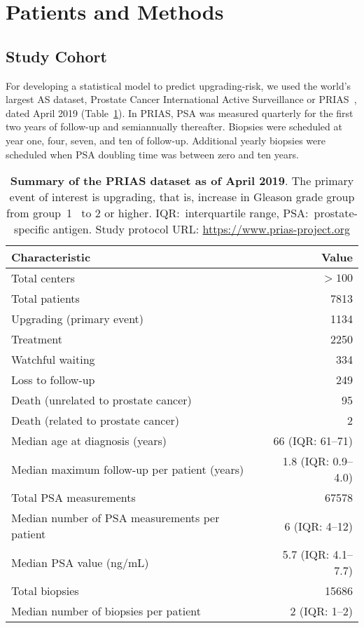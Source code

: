 \section{Patients and Methods}
\subsection{Study Cohort}
\label{subsec:cohort}
For developing a statistical model to predict upgrading-risk, we used the world's largest AS dataset, Prostate Cancer International Active Surveillance or PRIAS~\citep{bul2013active}, dated April 2019 (Table~\ref{table:prias_summary}). In PRIAS, PSA was measured quarterly for the first two years of follow-up and semiannually thereafter. Biopsies were scheduled at year one, four, seven, and ten of follow-up. Additional yearly biopsies were scheduled when PSA doubling time was between zero and ten years.

\begin{table}
\small\sf\centering
\caption{\textbf{Summary of the PRIAS dataset as of April 2019}. The primary event of interest is upgrading, that is, increase in Gleason grade group from group~1~\citep{epsteinGG2014} to 2 or higher. IQR:~interquartile range, PSA:~prostate-specific antigen. Study protocol URL: \url{https://www.prias-project.org}}
\label{table:prias_summary}
\begin{tabular}{lr}
\toprule
\textbf{Characteristic} & \textbf{Value}\\
\midrule
Total centers & $> 100$\\
Total patients & 7813\\
Upgrading (primary event) & 1134\\
Treatment & 2250\\
Watchful waiting & 334\\
Loss to follow-up & 249\\
Death (unrelated to prostate cancer) & 95\\
Death (related to prostate cancer) & 2\\
\midrule
Median age at diagnosis (years) & 66 (IQR: 61--71)\\
Median maximum follow-up per patient (years) &  1.8 (IQR: 0.9--4.0)\\
Total PSA measurements & 67578\\
Median number of PSA measurements per patient &  6 (IQR: 4--12)\\
Median PSA value (ng/mL) & 5.7 (IQR: 4.1--7.7)\\
Total biopsies & 15686\\
Median number of biopsies per patient &  2 (IQR: 1--2)\\
\bottomrule
\end{tabular}
\end{table}

